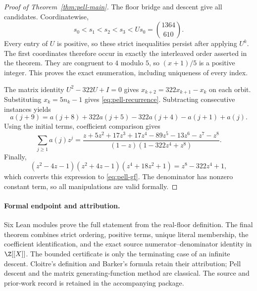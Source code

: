 \begin{proof}[Proof of Theorem~\ref{thm:pell-main}]
The floor bridge and descent give all candidates. Coordinatewise,
\[
 s_0<s_1<s_2<s_3<Us_0=\binom{1364}{610}.
\]
Every entry of $U$ is positive, so these strict inequalities persist
after applying $U^k$. The first coordinates therefore occur in exactly
the interleaved order asserted in the theorem. They are congruent to
$4$ modulo $5$, so $(x+1)/5$ is a positive integer. This proves
the exact enumeration, including uniqueness of every index.

The matrix identity $U^2-322U+I=0$ gives
$x_{k+2}=322x_{k+1}-x_k$ on each orbit. Substituting $x_k=5n_k-1$
gives \eqref{eq:pell-recurrence}. Subtracting consecutive instances yields
\[
 a(j+9)=a(j+8)+322a(j+5)-322a(j+4)-a(j+1)+a(j).
\]
Using the initial terms, coefficient comparison gives
\[
 \sum_{j\ge1}a(j)z^j=
 \frac{z+5z^2+17z^3+17z^4-89z^5-13z^6-z^7-z^8}
 {(1-z)(1-322z^4+z^8)}.
\]
Finally,
\[
 (z^2-4z-1)(z^2+4z-1)(z^4+18z^2+1)=z^8-322z^4+1,
\]
which converts this expression to \eqref{eq:pell-gf}. The denominator
has nonzero constant term, so all manipulations are valid formally.
\end{proof}

\paragraph{Formal endpoint and attribution.}
Six Lean modules prove the full statement from the real-floor definition.
The final theorem  combines strict ordering,
positive terms, unique literal membership, the coefficient identification,
and the exact source numerator--denominator identity in $\Z[[X]]$.
The bounded certificate is only the terminating case of an infinite descent.
Cloitre's definition and Barker's formula retain their attribution;
Pell descent and the matrix generating-function method are classical.
The source and prior-work record is retained in the accompanying package.

